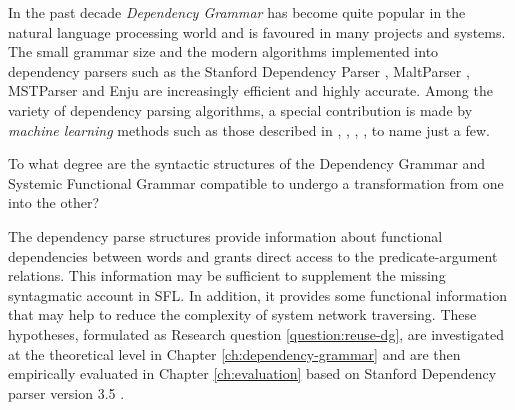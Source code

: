 
%
In the past decade \textit{Dependency Grammar} \citep{Tesniere2015} has become quite popular in the natural language processing world and is favoured in many projects and systems. The small grammar size and the modern algorithms implemented into dependency parsers such as the Stanford Dependency Parser \citep{Marneffe2006}, MaltParser \citep{Nivre2006}, MSTParser \citep{McDonald2006} and Enju \citep{Miyao2005} are increasingly efficient and highly accurate. Among the variety of dependency parsing algorithms, a special contribution is made by  \textit{machine learning} methods such as those described in \citet{mcdonald2005online}, \citet{mcdonald2006online}, \citet{carreras2007experiments}, \citet{zhang2011transition}, \citet{pei2015effective} to name just a few. 

\begin{question}\label{question:reuse-dg}
    To what degree are the syntactic structures of the Dependency Grammar and Systemic Functional Grammar compatible to undergo a transformation from one into the other?
\end{question}

The dependency parse structures provide information about functional dependencies between words and grants direct access to the predicate-argument relations. %
This information may be sufficient to supplement the missing syntagmatic account in SFL. In addition, it provides some functional information that may help to reduce the complexity of system network traversing. 
These hypotheses, formulated as Research question \ref{question:reuse-dg}, are investigated at the theoretical level in Chapter \ref{ch:dependency-grammar} and are then empirically evaluated in Chapter \ref{ch:evaluation} based on Stanford Dependency parser version 3.5 \citep{Marneffe2008a,Marneffe2008, Marneffe2014}.  


